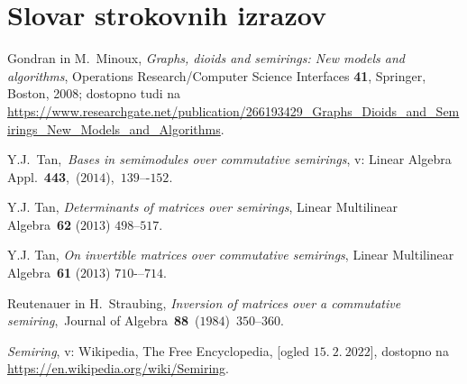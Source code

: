\documentclass[mat1]{fmfdelo}
\begin{document}
\section*{Slovar strokovnih izrazov}


\begin{thebibliography}{99}
	
	
	 Gondran in M.~Minoux, \emph{Graphs, dioids and semirings: New models and algorithms}, Operations Research/Computer Science Interfaces \textbf{41}, Springer, Boston, 2008; dostopno tudi na \url{https://www.researchgate.net/publication/266193429_Graphs_Dioids_and_Semirings_New_Models_and_Algorithms}.
	
	
	 Y.J.~Tan,~\emph{Bases in semimodules over commutative semirings}, v: Linear Algebra Appl.~\textbf{443},~($2014$),~$139$–-$152$.
	
	 Y.J. Tan, \emph{Determinants of matrices over semirings}, Linear Multilinear Algebra~\textbf{62} ($2013$) $498$--$517$.
	
	 Y.J. Tan, \emph{On invertible matrices over commutative semirings}, Linear Multilinear Algebra~\textbf{61} ($2013$) $710$-–$714$.
	
	 Reutenauer in H.~Straubing, \emph{Inversion of matrices over a commutative semiring},~Journal of Algebra~\textbf{88}~($1984$)~$350$--$360$.
	
	 \emph{Semiring}, v: Wikipedia, The Free Encyclopedia, [ogled $15.~2.~2022$], dostopno na \url{https://en.wikipedia.org/wiki/Semiring}.
	
\end{thebibliography}
\end{document}
